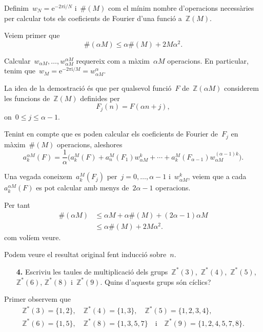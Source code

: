\documentclass[a4paper]{article}
\theoremstyle{plain}
\theoremstyle{definition}
\newcommand{\iu}{\mathrm{i}}
\newcommand{\e}{\mathrm{e}}
\providecommand{\uppi}{\pi}
\newcommand{\ZZ}{\mathbb{Z}}
\begin{document}
Definim~\(w_{N} = \e^{-2\uppi\iu/N}\) i~\(\#(M)\) com el mínim nombre d'operacions
necessàries per calcular tots els coeficients de Fourier d'una funció
a~\(\ZZ(M)\).

Veiem primer que
\begin{equation}
    \label{ex3:eq1}
    \#(\alpha M)
    \leq
    \alpha\#(M)
    +
    2M\alpha^{2}.
\end{equation}

Calcular~\(w_{\alpha M},\dots,w_{\alpha M}^{\alpha M}\) requereix com a
màxim~\(\alpha M\) operacions.
En particular, tenim que~\(w_{M} = \e^{-2\uppi\iu/M} = w_{\alpha M}^{\alpha}\).

La idea de la demostració és que per qualsevol funció~\(F\) de~\(\ZZ(\alpha M)\)
considerem les funcions de~\(\ZZ(M)\) definides per
\[
    F_{j}(n) = F(\alpha n + j),
\]
on~\(0 \leq j \leq \alpha-1\).

Tenint en compte que es poden calcular els coeficients de Fourier de~\(F_{j}\)
en màxim~\(\#(M)\) operacions, aleshores
\[
    a_{k}^{\alpha M}(F)
    =
    \frac{1}{\alpha}
    \bigl(
        a_{k}^{M}(F)
        +
        a_{n}^{M}(F_{1})
        w_{\alpha M}^{k}
        + \cdots +
        a_{k}^{M}(F_{\alpha-1})
    w_{\alpha M}^{(\alpha-1)k}
    \bigr).
\]

Una vegada coneixem~\(a_{k}^{M}(F_{j})\) per~\(j=0,\dots,\alpha-1\)
i~\(w_{\alpha M}^{k}\), veiem que a cada~\(a_{k}^{\alpha M}(F)\) es pot calcular
amb menys de~\(2\alpha-1\) operacions.

Per tant
\begin{align*}
    \#(\alpha M)
    &\leq
    \alpha M + \alpha \#(M) + (2\alpha - 1)\alpha M \\
    &\leq \alpha \#(M) + 2M\alpha^{2}.
\end{align*}
com volíem veure.

Podem veure el resultat original fent inducció sobre~\(n\).

\clearpage

\begin{enumerate}
    \item[\textbf{4.}] Escriviu les taules de multiplicació dels
        grups~\(\ZZ^{\ast}(3)\),~\(\ZZ^{\ast}(4)\),~\(\ZZ^{\ast}(5)\),~\(\ZZ^{\ast}(6)\),
        \(\ZZ^{\ast}(8)\) i~\(\ZZ^{\ast}(9)\).
        Quins d'aquests grups són cíclics?
\end{enumerate}

Primer observem que
\begin{multline*}
    \ZZ^{\ast}(3) = \{1,2\},
    \quad
    \ZZ^{\ast}(4) = \{1,3\},
    \quad
    \ZZ^{\ast}(5) = \{1,2,3,4\},
    \\
    \ZZ^{\ast}(6) = \{1,5\},
    \quad
    \ZZ^{\ast}(8) = \{1,3,5,7\}
    \quad\text{i}\quad
    \ZZ^{\ast}(9) = \{1,2,4,5,7,8\}.
\end{multline*}
\end{document}
